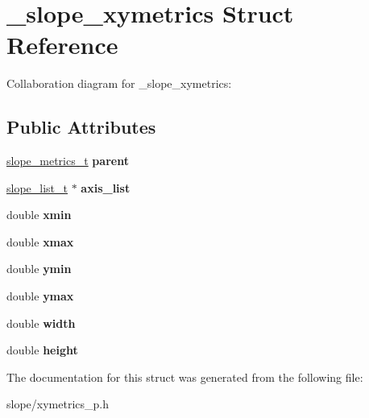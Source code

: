 \hypertarget{struct__slope__xymetrics}{\section{\+\_\+slope\+\_\+xymetrics Struct Reference}
\label{struct__slope__xymetrics}
}


Collaboration diagram for \+\_\+slope\+\_\+xymetrics\+:
\subsection*{Public Attributes}
\begin{DoxyCompactItemize}
\item 
\hypertarget{struct__slope__xymetrics_aec0f7546c89f84b770fe7967602f8b5f}{\hyperlink{group__Metrics_gab80787ee8ae8dc449e770249fe0e3c35}{slope\+\_\+metrics\+\_\+t} {\bfseries parent}}\label{struct__slope__xymetrics_aec0f7546c89f84b770fe7967602f8b5f}

\item 
\hypertarget{struct__slope__xymetrics_a0872d22ecbf7129241bf947cfef15769}{\hyperlink{group__List_ga88326d377deca937191acac6784bff0e}{slope\+\_\+list\+\_\+t} $\ast$ {\bfseries axis\+\_\+list}}\label{struct__slope__xymetrics_a0872d22ecbf7129241bf947cfef15769}

\item 
\hypertarget{struct__slope__xymetrics_ad1d3347be073c3d5e54dcc4fcf8be3f0}{double {\bfseries xmin}}\label{struct__slope__xymetrics_ad1d3347be073c3d5e54dcc4fcf8be3f0}

\item 
\hypertarget{struct__slope__xymetrics_a1b5bc871445b58a36fdbd8fda316da64}{double {\bfseries xmax}}\label{struct__slope__xymetrics_a1b5bc871445b58a36fdbd8fda316da64}

\item 
\hypertarget{struct__slope__xymetrics_a0185807d2c62875950fb1001005ee0b3}{double {\bfseries ymin}}\label{struct__slope__xymetrics_a0185807d2c62875950fb1001005ee0b3}

\item 
\hypertarget{struct__slope__xymetrics_a68d0668dd3b423c8fb44fe943cfaaed6}{double {\bfseries ymax}}\label{struct__slope__xymetrics_a68d0668dd3b423c8fb44fe943cfaaed6}

\item 
\hypertarget{struct__slope__xymetrics_adecdb95c1bc9394ea4332c2182539153}{double {\bfseries width}}\label{struct__slope__xymetrics_adecdb95c1bc9394ea4332c2182539153}

\item 
\hypertarget{struct__slope__xymetrics_a51349b89d2fb960fe1503ac3104d80d0}{double {\bfseries height}}\label{struct__slope__xymetrics_a51349b89d2fb960fe1503ac3104d80d0}

\end{DoxyCompactItemize}


The documentation for this struct was generated from the following file\+:\begin{DoxyCompactItemize}
\item 
slope/xymetrics\+\_\+p.\+h\end{DoxyCompactItemize}
